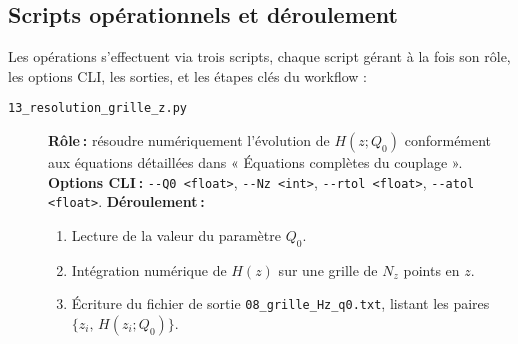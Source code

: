 \subsection{Scripts opérationnels et déroulement}

Les opérations s’effectuent via trois scripts, chaque script gérant à la fois son rôle, les options CLI, les sorties, et les étapes clés du workflow :

\begin{description}
  \item[\texttt{13\_resolution\_grille\_z.py}]  
    \textbf{Rôle :} résoudre numériquement l’évolution de \(H(z;Q_{0})\) conformément aux équations détaillées dans « Équations complètes du couplage ».  
    \textbf{Options CLI :}  
      \verb|--Q0 <float>|, \verb|--Nz <int>|, \verb|--rtol <float>|, \verb|--atol <float>|.  
    \textbf{Déroulement :}
    \begin{enumerate}
      \item Lecture de la valeur du paramètre \(Q_{0}\).  
      \item Intégration numérique de \(H(z)\) sur une grille de \(N_z\) points en \(z\).  
      \item Écriture du fichier de sortie \texttt{08\_grille\_Hz\_q0.txt}, listant les paires \(\{z_{i},\,H(z_{i};Q_{0})\}\).  
    \end{enumerate}


\end{description}
